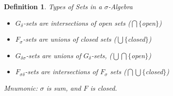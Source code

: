 \documentclass[12pt]{Qual}
\newtheorem{definition}{Definition}
\begin{document}
\vspace{0.25cm}
\begin{definition}{\Large\textit{Types of Sets in a $\sigma$-Algebra}}

\begin{itemize}
\renewcommand\labelitemi{\faCoffee}
    \item $G_\delta$-sets are intersections of open sets ($\bigcap\{$open$\}$)
    \item $F_\sigma$-sets are unions of closed sets ($\bigcup\{$closed$\}$)
    \item $G_{\delta\sigma}$-sets are unions of $G_\delta$-sets, ($\bigcup\bigcap\{$open$\}$)
    \item $F_{\sigma\delta}$-sets are intersections of $F_\sigma$ sets ($\bigcap\bigcup\{$closed$\}$)
\end{itemize}

Mnumonic: $\sigma$ is sum, and $F$ is closed.

\end{definition}
\vspace{0.5cm}
\newpage
\end{document}

